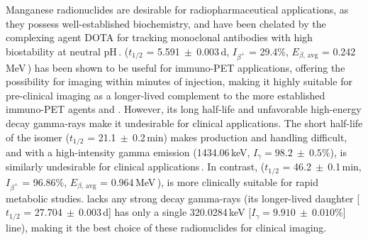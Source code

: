 Manganese radionuclides are desirable for radiopharmaceutical applications, as 
they possess well-established biochemistry, and have been 
chelated 
by the complexing agent DOTA for tracking monoclonal antibodies with high biostability at neutral pH\,\cite{Graves2015}.
 ($t_{1/2}$ = 5.591$~\pm~$0.003\,d, $I_{\beta^+}$ = 29.4\%, $E_{\beta\text{, avg}}$ = 0.242\,MeV\,\cite{Dong2015}) has been shown to be useful for immuno-PET applications, 
offering the possibility for imaging within minutes of injection,
making it highly suitable for pre-clinical imaging as a longer-lived complement   to the more established immuno-PET agents  and   .  
However, its  long half-life and unfavorable high-energy decay gamma-rays 
make it undesirable for clinical applications.
The short half-life of the   isomer ($t_{1/2}$ = 21.1$~\pm~$0.2\,min)
makes production and handling difficult, and with a  high-intensity gamma emission (1434.06\,keV, $I_\gamma = 98.2~\pm~0.5\%$),  
 is similarly undesirable for clinical applications\,\cite{Dong2015}.
In contrast,  ($t_{1/2}$ = 46.2$~\pm~$0.1\,min, $I_{\beta^+}$ = 96.86\%, $E_{\beta\text{, avg}}$ = 0.964\,MeV\,\cite{Wang2017}), 
is more clinically suitable for rapid metabolic studies.
 lacks any strong decay gamma-rays (its longer-lived daughter  [$t_{1/2}$ = 27.704$~\pm~$0.003\,d] has only a single  320.0284\,keV [$I_\gamma = 9.910~\pm~0.010\%$] line), making it the best choice of these radionuclides for clinical imaging.



